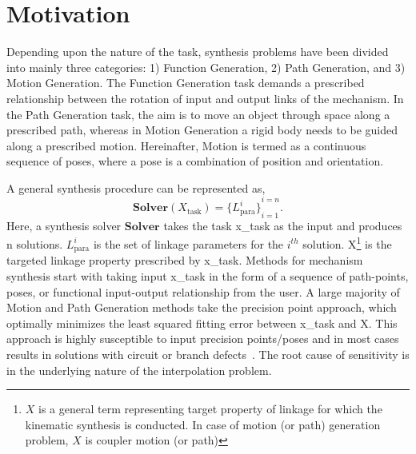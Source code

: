 \section{Motivation}
Depending upon the nature of the task, synthesis problems have been divided into mainly three categories: 1) Function Generation, 2) Path Generation, and 3) Motion Generation.
The Function Generation task demands a prescribed relationship between the rotation of input and output links of the mechanism.
In the Path Generation task, the aim is to move an object through space along a prescribed path, whereas in Motion Generation a rigid body needs to be guided along a prescribed motion.
Hereinafter, Motion is termed as a continuous sequence of poses, where a \ac{pose} is a combination of position and orientation.

A general synthesis procedure can be represented as,
\begin{equation}
     \textbf{Solver}(X_{\text{task}}) =  {\{L^{i}_{\text{para}}\}}_{i=1}^{i=n}.
\end{equation}
Here, a synthesis solver $\textbf{Solver}$ takes the task \ac{x_task} as the input and produces n solutions. $L^{i}_{\text{para}}$ is the set of linkage parameters for the $i^{th}$ solution. 
\ac{X}\footnote{$X$ is a general term representing target property of linkage for which the kinematic synthesis is conducted. In case of motion (or path) generation problem, $X$ is coupler motion (or path)} is the targeted linkage property prescribed by \ac{x_task}.
Methods for mechanism synthesis start with taking input \ac{x_task} in the form of a sequence of path-points, poses, or functional input-output relationship from the user. A large majority of Motion and Path Generation methods take the precision point approach, which optimally minimizes the least squared fitting error between \ac{x_task} and \ac{X}.
This approach is highly susceptible to input precision points/poses and in most cases results in solutions with circuit or branch defects~\cite{chasemirth}. The root cause of sensitivity is in the underlying nature of the interpolation problem.

